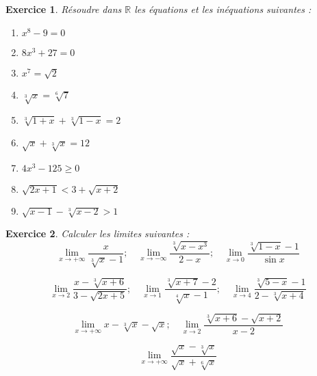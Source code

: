 \documentclass[12pt,a4paper]{article}
\theoremstyle{mystyle}
\newtheorem{exo}{Exercice}
\begin{document}
\begin{multicols*}{2}
\begin{exo}
    Résoudre dans $\mathbb{R}$ les équations et les inéquations suivantes :
    \begin{multicols}{2}
        \begin{enumerate}
            \item $x^8 - 9 = 0$
            \item $8x^3 + 27 = 0$
            \item $x^7 = \sqrt{2}$
            \item $\sqrt[3]{x} = \sqrt[6]{7}$
            \item $\sqrt[3]{1 + x} + \sqrt[3]{1 - x} = 2$
            \item $\sqrt{x} + \sqrt[3]{x} = 12$
            \item $4x^3 - 125 \geq 0$
            \item $\sqrt{2x+1} < 3 + \sqrt{x + 2}$
            \item $\sqrt{x - 1} - \sqrt[3]{x - 2} > 1$
        \end{enumerate}
    \end{multicols}
\end{exo}

\begin{exo}
Calculer les limites suivantes :
    \[
\lim_{x \to +\infty} \frac{x}{\sqrt[3]{x} - 1} ; \quad
\lim_{x \to -\infty} \frac{\sqrt[3]{x - x^3}}{2 - x} ; \quad
\lim_{x \to 0} \frac{\sqrt[3]{1 - x} - 1}{\sin x}
\]

\[
\lim_{x \to 2} \frac{x - \sqrt[3]{x + 6}}{3 - \sqrt{2x + 5}} ; \quad
\lim_{x \to 1} \frac{\sqrt[3]{x + 7} - 2}{\sqrt[4]{x} - 1} ; \quad
\lim_{x \to 4} \frac{\sqrt[3]{5 - x} - 1}{2 - \sqrt[3]{x + 4}}
\]

\[
\lim_{x \to +\infty} x - \sqrt[3]{x} - \sqrt{x} ; \quad
\lim_{x \to 2} \frac{\sqrt[3]{x + 6} - \sqrt{x + 2}}{x - 2}
\]

\[
\lim_{x \to +\infty} \frac{\sqrt{x} - \sqrt[3]{x}}{\sqrt{x} + \sqrt[6]{x}}
\]
\end{exo}



\end{multicols*}
\end{document}
